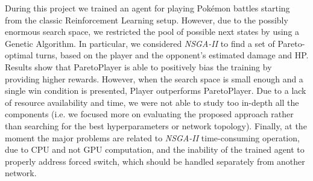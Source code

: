 During this project we trained an agent for playing Pokémon battles starting from the classic Reinforcement Learning setup. However, due to the possibly enormous search space, we restricted the pool of possible next states by using a Genetic Algorithm. In particular, we considered \emph{NSGA-II} to find a set of Pareto-optimal turns, based on the player and the opponent's estimated damage and HP. Results show that ParetoPlayer is able to positively bias the training by providing higher rewards. However, when the search space is small enough and a single win condition is presented, Player outperforms ParetoPlayer. Due to a lack of resource availability and time, we were not able to study too in-depth all the components (i.e. we focused more on evaluating the proposed approach rather than searching for the best hyperparameters or network topology). Finally, at the moment the major problems are related to \emph{NSGA-II} time-consuming operation, due to CPU and not GPU computation, and the inability of the trained agent to properly address forced switch, which should be handled separately from another network.